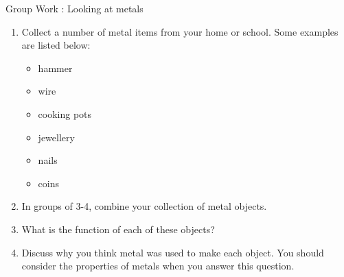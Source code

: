 \label{m38708*secfhsst!!!underscore!!!id320}
            \begin{activity}{Group Work : Looking at metals}{
            \nopagebreak
        \label{m38708*id65869}\begin{enumerate}[noitemsep, label=\textbf{\arabic*}. ] 
            \label{m38708*uid83}\item Collect a number of metal items from your home or school. Some examples are listed below:
\label{m38708*id65885}\begin{itemize}[noitemsep]
            \label{m38708*uid84}\item hammer
\label{m38708*uid85}\item wire
\label{m38708*uid86}\item cooking pots
\label{m38708*uid87}\item jewellery
\label{m38708*uid88}\item nails
\label{m38708*uid89}\item coins
\end{itemize}
        \label{m38708*uid90}\item In groups of 3-4, combine your collection of metal objects.
\label{m38708*uid91}\item What is the function of each of these objects?
\label{m38708*uid92}\item Discuss why you think metal was used to make each object. You should consider the properties of metals when you answer this question.
\end{enumerate}}
\end{activity}
      \label{m38708*uid93}
